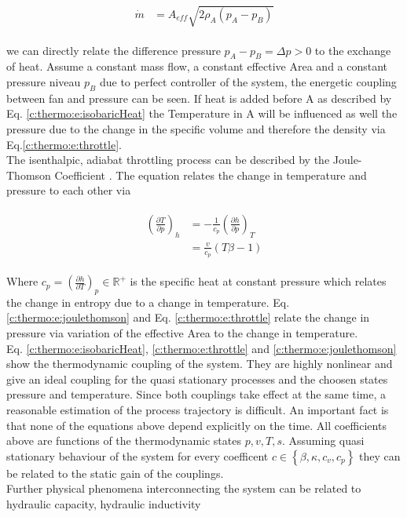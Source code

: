 \begin{align}
\begin{split}
\dot{m} & = A_{eff} \sqrt{2 \rho_A  \left( p_A -p_B \right) }
\end{split}
\label{c:thermo:e:throttle}
\end{align}

we can directly relate the difference pressure $p_A - p_B = \Delta p > 0$ to the exchange of heat. Assume a constant mass flow, a constant effective Area and a constant pressure niveau $p_B$ due to perfect controller of the system, the energetic coupling between fan and pressure can be seen. If heat is added before A as described by Eq. \ref{c:thermo:e:isobaricHeat} the Temperature in A will be influenced as well the pressure due to the change in the specific volume and therefore the density via Eq.\ref{c:thermo:e:throttle}.\\

The isenthalpic, adiabat throttling process can be described by the Joule-Thomson Coefficient \cite[p.387]{Struchtrup2014}. The equation relates the change in temperature and pressure to each other via

\begin{align}
\begin{split}
\left( \frac{\partial T}{\partial p}\right)_h &= -\frac{1}{c_p} \left(\frac{\partial h}{ \partial p} \right)_T \\
&= \frac{v}{c_p}\left( T\beta - 1 \right) 
\end{split}
\label{c:thermo:e:joulethomson}
\end{align}

Where $c_p = \left(\frac{\partial h}{\partial T} \right)_p \in \mathbb{R}^+$ is the specific heat at constant pressure which relates the change in entropy due to a change in temperature.
Eq. \ref{c:thermo:e:joulethomson} and Eq. \ref{c:thermo:e:throttle} relate the change in pressure via variation of the effective Area to the change in temperature. \\

Eq. \ref{c:thermo:e:isobaricHeat}, \ref{c:thermo:e:throttle} and \ref{c:thermo:e:joulethomson} show the thermodynamic coupling of the system. They are highly nonlinear and give an ideal coupling for the quasi stationary processes and the choosen states pressure and temperature. Since both couplings take effect at the same time, a reasonable estimation of the process trajectory is difficult.\newline
An important fact is that none of the equations above depend explicitly on the time. All coefficients above are functions of the thermodynamic states $p,v,T,s$. Assuming quasi stationary behaviour of the system for every coefficent $c \in \left\lbrace \beta, \kappa, c_v, c_p \right\rbrace$ they can be related to the static gain of the couplings.\\

Further physical phenomena interconnecting the system can be related to hydraulic capacity, hydraulic inductivity 